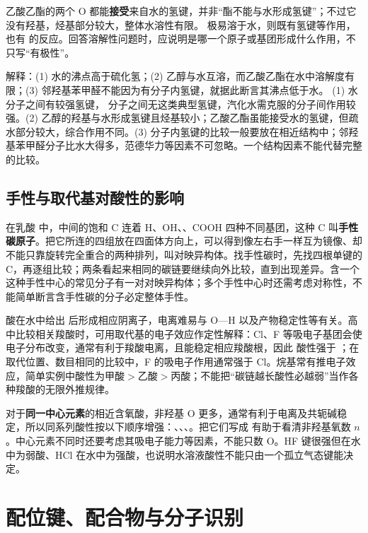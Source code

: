 乙酸乙酯的两个 O 都能\textbf{接受}来自水的氢键，并非“酯不能与水形成氢键”；不过它没有羟基，烃基部分较大，整体水溶性有限。 极易溶于水，则既有氢键等作用，也有  的反应。回答溶解性问题时，应说明是哪一个原子或基团形成什么作用，不只写“有极性”。

\begin{liti}[把性质与对应作用联系起来]
解释：(1) 水的沸点高于硫化氢；(2) 乙醇与水互溶，而乙酸乙酯在水中溶解度有限；(3) 邻羟基苯甲醛不能因为有分子内氢键，就据此断言其沸点低于水。
\tcblower
\jie (1) 水分子之间有较强氢键， 分子之间无这类典型氢键，汽化水需克服的分子间作用较强。(2) 乙醇的羟基与水形成氢键且烃基较小；乙酸乙酯虽能接受水的氢键，但疏水部分较大，综合作用不同。(3) 分子内氢键的比较一般要放在相近结构中；邻羟基苯甲醛分子比水大得多，范德华力等因素不可忽略。一个结构因素不能代替完整的比较。
\end{liti}

\subsection{手性与取代基对酸性的影响}
在乳酸  中，中间的饱和 C 连着 H、OH、、COOH 四种不同基团，这种 C 叫\textbf{手性碳原子}。把它所连的四组放在四面体方向上，可以得到像左右手一样互为镜像、却不能只靠旋转完全重合的两种排列，叫对映异构体。找手性碳时，先找四根单键的 C，再逐组比较；两条看起来相同的碳链要继续向外比较，直到出现差异。含一个这种手性中心的常见分子有一对对映异构体；多个手性中心时还需考虑对称性，不能简单断言含手性碳的分子必定整体手性。

酸在水中给出  后形成相应阴离子，电离难易与 O—H 以及产物稳定性等有关。高中比较相关羧酸时，可用取代基的电子效应作定性解释：Cl、F 等吸电子基团会使电子分布改变，通常有利于羧酸电离，且能稳定相应羧酸根，因此  酸性强于 ；在取代位置、数目相同的比较中，F 的吸电子作用通常强于 Cl。烷基常有推电子效应，简单实例中酸性为甲酸$>$乙酸$>$丙酸；不能把“碳链越长酸性必越弱”当作各种羧酸的无限外推规律。

对于\textbf{同一中心元素}的相近含氧酸，非羟基 O 更多，通常有利于电离及共轭碱稳定，所以同系列酸性按以下顺序增强：、、、。把它们写成  有助于看清非羟基氧数 $n$。中心元素不同时还要考虑其吸电子能力等因素，不能只数 O。HF 键很强但在水中为弱酸、HCl 在水中为强酸，也说明水溶液酸性不能只由一个孤立气态键能决定。

\section{配位键、配合物与分子识别}

